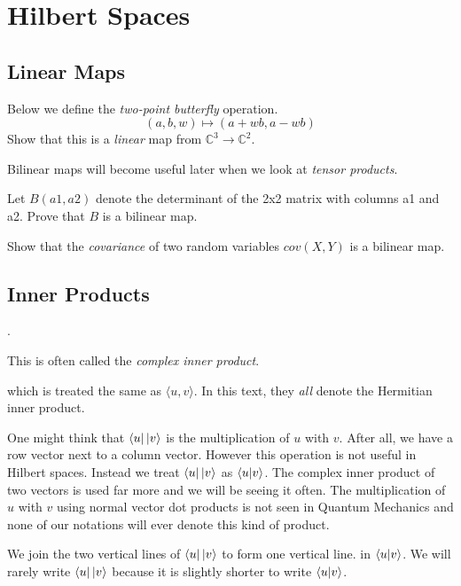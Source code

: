 
\chapter{Hilbert Spaces}


\section{Linear Maps}

\begin{example}
Below we define the \textit{two-point butterfly} operation.
$$(a,b,w) \mapsto (a + wb, a-wb)$$
Show that this is a \textit{linear} map from $\mathbb{C}^3 \rightarrow \mathbb{C}^2$. 
\end{example}




Bilinear maps will become useful later when we look at \textit{tensor products}.

\begin{example}
Let $B(a1,a2)$ denote the determinant of the 2x2 matrix with columns a1 and a2.
Prove that $B$ is a bilinear map. 
\end{example}


\begin{example}
Show that the \textit{covariance} of two random variables $cov(X,Y)$ is a bilinear map. 
\end{example}


\section{Inner Products}


.

This is often called the \textit{complex inner product}. 




which is treated the same as $\langle u,v \rangle$. In this text, 
they \textit{all} denote the Hermitian inner product. 

One might think that $\left\langle u\right|\left|v\right\rangle$ is the multiplication of $u$ with $v$.
After all, we have a row vector next to a column vector. 
However this operation is not useful in Hilbert spaces.  
Instead we treat $\left\langle u\right|\left|v\right\rangle$ as $\left\langle u | v\right\rangle$. The complex 
inner product of two vectors is used far more and we will be seeing it often. 
The multiplication of $u$ with $v$ using normal vector dot products is not seen
in Quantum Mechanics and none of our notations will ever denote this kind of product. 

We join the two vertical lines of $\left\langle u\right|\left|v\right\rangle$ to form one vertical line. 
in $\left\langle u | v\right\rangle$. We will rarely write $\left\langle u\right|\left|v\right\rangle$ because it is 
slightly shorter to write $\left\langle u | v\right\rangle$. 
